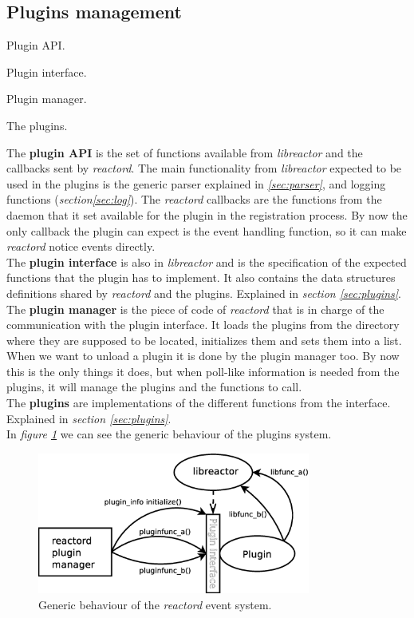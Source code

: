 \subsection{Plugins management}
\begin{list}{-}{The \emph{reactor} plugin system is formed by four parts:}
  \item Plugin API.
  \item Plugin interface.
  \item Plugin manager.
  \item The plugins.
\end{list}
The {\bf plugin API} is the set of functions available from \emph{libreactor} and the callbacks sent by \emph{reactord}. The main functionality
from \emph{libreactor} expected to be used in the plugins is the generic parser explained in \emph{\ref{sec:parser}}, and logging 
functions (\emph{section\ref{sec:log}}). The 
\emph{reactord} callbacks are the functions from the daemon that  it set available for the plugin in the registration process. By now
the only callback the plugin can expect is the event handling function, so it can make \emph{reactord} notice events directly.\\
The {\bf plugin interface} is also in \emph{libreactor} and is the specification of the expected functions that the plugin has to implement.
It also contains the data structures definitions shared by \emph{reactord} and the plugins. Explained in \emph{section 
\ref{sec:plugins}}.\\
The {\bf plugin manager} is the piece of code of \emph{reactord} that is in charge of the communication with the plugin interface. It loads the
plugins from the directory where they are supposed to be located, initializes them and sets them into a list. When we want to unload a
plugin it is done by the plugin manager too. By now this is the only things it does, but when poll-like information is needed from the 
plugins, it will manage the plugins and the functions to call.\\
The {\bf plugins} are implementations of the different functions from the interface. Explained in \emph{section \ref{sec:plugins}}.\\
In \emph{figure \ref{fig:pluginsdia}} we can see the generic behaviour of the plugins system.
\begin{figure}[h]
  \centering
  \includegraphics[width=0.8\textwidth,keepaspectratio]{img/pluginsdia}
  \caption{Generic behaviour of the \emph{reactord} event system.}
  \label{fig:pluginsdia}
\end{figure}
